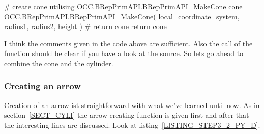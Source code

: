 \begin{python}[moreemph={[4], 46, 48},caption={Step3\_2.py - Function defining a cone from a point, a direction vector, the height and two radi},label=LISTING_STEP3_2_PY_C]
    # create cone utilising OCC.BRepPrimAPI.BRepPrimAPI_MakeCone
    cone = OCC.BRepPrimAPI.BRepPrimAPI_MakeCone(    local_coordinate_system, 
                                                    radius1, 
                                                    radius2, 
                                                    height )
    # return cone
    return cone
\end{python}
I think the comments given in the code above are sufficient.
Also the call of the function should be clear if you have a look at the source. So lets go ahead to combine the cone and the cylinder.

\subsubsection{Creating an arrow}
\label{SECT_ARROW}
Creation of an arrow ist straightforward with what we've learned until now.
As in section~\ref{SECT_CYLI} the arrow creating function is given first and after that the interesting lines are discussed.
Look at listing~\ref{LISTING_STEP3_2_PY_D}. 
